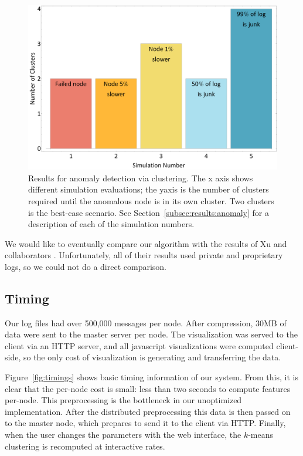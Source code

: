 \documentclass[conference]{style/acmsiggraph}
\begin{document}
\begin{figure}[t]
    \centering
    \includegraphics[width=1.0\columnwidth]{images/anomaly.pdf}
    \caption{Results for anomaly detection via clustering. The x axis shows different simulation evaluations; the yaxis is the number of clusters required until the anomalous node is in its own cluster. Two clusters is the best-case scenario. See Section~\ref{subsec:results:anomaly} for a description of each of the simulation numbers.}
    \label{fig:anomaly}
\end{figure}

We would like to eventually compare our algorithm with the results of Xu and collaborators \cite{Xu09}.
Unfortunately, all of their results used private and proprietary logs, so we could not do a direct comparison.

\subsection{Timing}
\label{subsec:results:timing}
Our log files had over 500,000 messages per node.
After compression, 30MB of data were sent to the master server per node.
The visualization was served to the client via an HTTP server, and all javascript visualizations were computed client-side, so the only cost of visualization is generating and transferring the data.

Figure~\ref{fig:timings} shows basic timing information of our system.
From this, it is clear that the per-node cost is small: less than two seconds to compute features per-node.
This preprocessing is the bottleneck in our unoptimized implementation.
After the distributed preprocessing this data is then passed on to the master node, which prepares to send it to the client via HTTP.
Finally, when the user changes the parameters with the web interface, the $k$-means clustering is recomputed at interactive rates.
\end{document}
